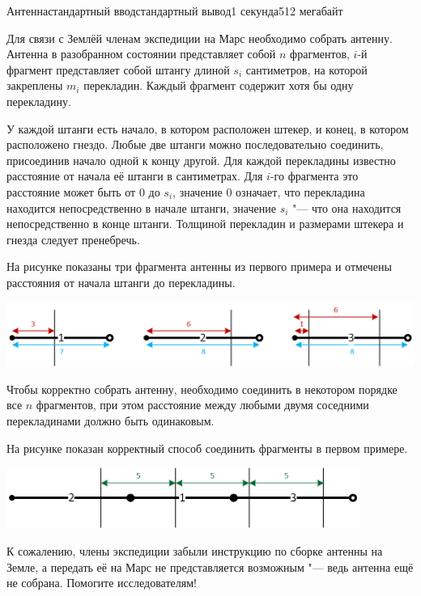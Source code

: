 \begin{problem}{Антенна}{стандартный ввод}{стандартный вывод}{1 секунда}{512 мегабайт}

Для связи с Землёй членам экспедиции на Марс необходимо собрать антенну. Антенна в разобранном состоянии представляет собой $n$ фрагментов, $i$-й фрагмент представляет собой штангу длиной $s_i$ сантиметров, на которой закреплены $m_i$ перекладин. Каждый фрагмент содержит хотя бы одну перекладину.

У каждой штанги есть начало, в котором расположен штекер, и конец, в котором расположено гнездо. Любые две штанги можно последовательно соединить, присоединив начало одной к концу другой. Для каждой перекладины известно расстояние от начала её штанги в сантиметрах. Для $i$-го фрагмента это расстояние может быть от $0$ до $s_i$, значение 0 означает, что перекладина находится непосредственно в начале штанги, значение $s_i$ "--- что она находится непосредственно в конце штанги. Толщиной перекладин и размерами штекера и гнезда следует пренебречь.

На рисунке показаны три фрагмента антенны из первого примера и отмечены расстояния от начала штанги до перекладины.

\begin{center}
\includegraphics[width=14cm]{parts.png}
\end{center}

Чтобы корректно собрать антенну, необходимо соединить в некотором порядке все $n$ фрагментов, при этом расстояние между любыми двумя соседними перекладинами должно быть одинаковым. 

На рисунке показан корректный способ соединить фрагменты в первом примере.

\begin{center}
\includegraphics[width=11.53cm]{connected.png}
\end{center}

К сожалению, члены экспедиции забыли инструкцию по сборке антенны на Земле, а передать её на Марс не представляется возможным "--- ведь антенна ещё не собрана. Помогите исследователям!


\end{problem}
